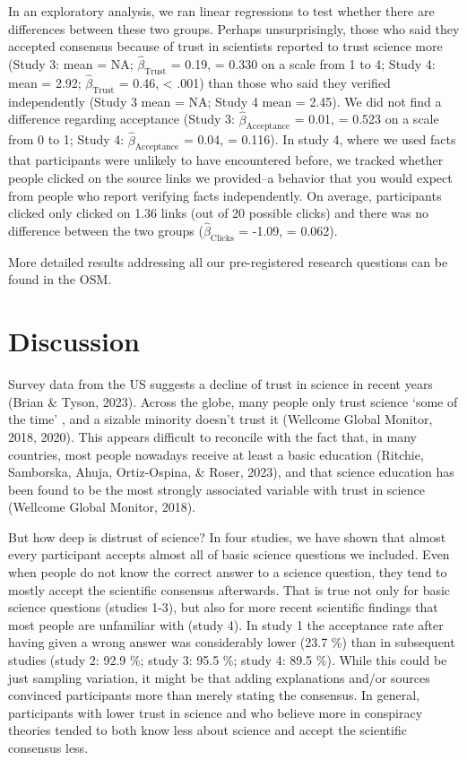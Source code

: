 \documentclass[
  doc,floatsintext]{apa6}
\begin{document}
In an exploratory analysis, we ran linear regressions to test whether there are differences between these two groups. Perhaps unsurprisingly, those who said they accepted consensus because of trust in scientists reported to trust science more (Study 3: mean = NA; \(\hat{\beta}_{\text{Trust}}\) = 0.19, = 0.330 on a scale from 1 to 4; Study 4: mean = 2.92; \(\hat{\beta}_{\text{Trust}}\) = 0.46, \textless{} .001) than those who said they verified independently (Study 3 mean = NA; Study 4 mean = 2.45). We did not find a difference regarding acceptance (Study 3: \(\hat{\beta}_{\text{Acceptance}}\) = 0.01, = 0.523 on a scale from 0 to 1; Study 4: \(\hat{\beta}_{\text{Acceptance}}\) = 0.04, = 0.116). In study 4, where we used facts that participants were unlikely to have encountered before, we tracked whether people clicked on the source links we provided--a behavior that you would expect from people who report verifying facts independently. On average, participants clicked only clicked on 1.36 links (out of 20 possible clicks) and there was no difference between the two groups (\(\hat{\beta}_{\text{Clicks}}\) = -1.09, = 0.062).

More detailed results addressing all our pre-registered research questions can be found in the OSM.

\section{Discussion}\label{discussion}

Survey data from the US suggests a decline of trust in science in recent years (Brian \& Tyson, 2023). Across the globe, many people only trust science `some of the time' , and a sizable minority doesn't trust it (Wellcome Global Monitor, 2018, 2020). This appears difficult to reconcile with the fact that, in many countries, most people nowadays receive at least a basic education (Ritchie, Samborska, Ahuja, Ortiz-Ospina, \& Roser, 2023), and that science education has been found to be the most strongly associated variable with trust in science (Wellcome Global Monitor, 2018).

But how deep is distrust of science? In four studies, we have shown that almost every participant accepts almost all of basic science questions we included. Even when people do not know the correct answer to a science question, they tend to mostly accept the scientific consensus afterwards. That is true not only for basic science questions (studies 1-3), but also for more recent scientific findings that most people are unfamiliar with (study 4). In study 1 the acceptance rate after having given a wrong answer was considerably lower (23.7 \%) than in subsequent studies (study 2: 92.9 \%; study 3: 95.5 \%; study 4: 89.5 \%). While this could be just sampling variation, it might be that adding explanations and/or sources convinced participants more than merely stating the consensus. In general, participants with lower trust in science and who believe more in conspiracy theories tended to both know less about science and accept the scientific consensus less.
\end{document}
